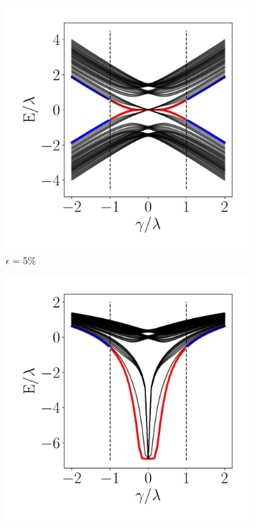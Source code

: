 \begin{figure}[h!]
     \begin{minipage}[h!]{0.9\textwidth}
         \begin{subfigure}[b!]{0.3 \textwidth}
            \caption{$\epsilon = 5\%$}             \includegraphics[width=\textwidth]{Imagenes/Resultados_Hoti_Fractal/bands_square_shh_0.1.pdf}
         \end{subfigure}\hspace*{-0.5em}
         \begin{subfigure}[b!]{0.3 \textwidth}
            \caption*{}
            \includegraphics[width=\textwidth]{Imagenes/Resultados_Hoti_Fractal/bands_square_shh_log0.1.pdf}

\end{subfigure}
\end{minipage}
\end{figure}
